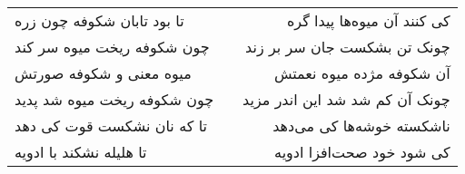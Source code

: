 \begin{center}
\begin{longtable}{l p{0.5cm} r}
\\
تا بود تابان شکوفه چون زره
&&
کی کنند آن میوه‌ها پیدا گره
\\
چون شکوفه ریخت میوه سر کند
&&
چونک تن بشکست جان سر بر زند
\\
میوه معنی و شکوفه صورتش
&&
آن شکوفه مژده میوه نعمتش
\\
چون شکوفه ریخت میوه شد پدید
&&
چونک آن کم شد شد این اندر مزید
\\
تا که نان نشکست قوت کی دهد
&&
ناشکسته خوشه‌ها کی می‌دهد
\\
تا هلیله نشکند با ادویه
&&
کی شود خود صحت‌افزا ادویه
\\
\end{longtable}
\end{center}
